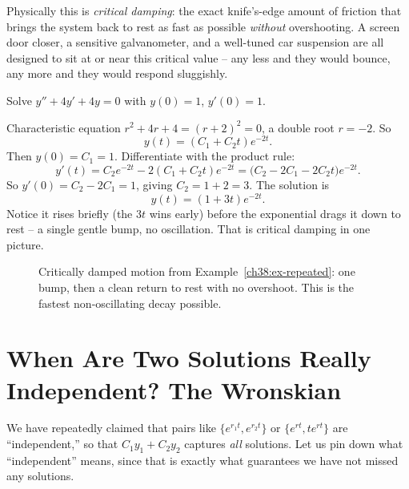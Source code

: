 Physically this is \emph{critical damping}: the exact knife's-edge amount of
friction that brings the system back to rest as fast as possible \emph{without}
overshooting. A screen door closer, a sensitive galvanometer, and a well-tuned
car suspension are all designed to sit at or near this critical value -- any less
and they would bounce, any more and they would respond sluggishly.

\begin{example}
\label{ch38:ex-repeated}
Solve $y'' + 4y' + 4y = 0$ with $y(0) = 1$, $y'(0) = 1$.

Characteristic equation $r^2 + 4r + 4 = (r+2)^2 = 0$, a double root $r = -2$. So
\[
  y(t) = (C_1 + C_2 t)e^{-2t}.
\]
Then $y(0) = C_1 = 1$. Differentiate with the product rule:
\[
  y'(t) = C_2 e^{-2t} - 2(C_1 + C_2 t)e^{-2t} = \big(C_2 - 2C_1 - 2 C_2 t\big)e^{-2t}.
\]
So $y'(0) = C_2 - 2C_1 = 1$, giving $C_2 = 1 + 2 = 3$. The solution is
\[
  y(t) = (1 + 3t)e^{-2t}.
\]
Notice it rises briefly (the $3t$ wins early) before the exponential drags it
down to rest -- a single gentle bump, no oscillation. That is critical damping in
one picture.
\end{example}

\begin{figure}[H]
\centering
{}
\caption{Critically damped motion from Example~\ref{ch38:ex-repeated}: one bump,
then a clean return to rest with no overshoot. This is the fastest non-oscillating
decay possible.}
\label{ch38:fig-critical}
\end{figure}

\section{When Are Two Solutions Really Independent? The Wronskian}
\label{ch38:wronskian}

We have repeatedly claimed that pairs like $\{e^{r_1 t}, e^{r_2 t}\}$ or
$\{e^{rt}, t e^{rt}\}$ are ``independent,'' so that $C_1 y_1 + C_2 y_2$ captures
\emph{all} solutions. Let us pin down what ``independent'' means, since that is
exactly what guarantees we have not missed any solutions.

